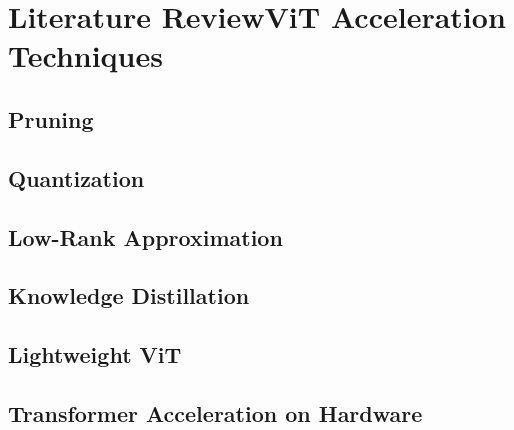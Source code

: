 \chapter{Literature Review\textemdash ViT Acceleration Techniques}
\minitoc

\section{Pruning}

\section{Quantization}

\section{Low-Rank Approximation}

\section{Knowledge Distillation}

\section{Lightweight ViT}

\section{Transformer Acceleration on Hardware}
